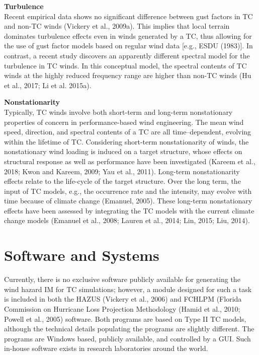 \noindent\textbf{Turbulence} \\Recent empirical data shows no significant difference between gust factors in TC and non-TC winds (Vickery et al., 2009a). This implies that local terrain dominates turbulence effects even in winds generated by a TC, thus allowing for the use of gust factor models based on regular wind data [e.g., ESDU (1983)]. In contrast, a recent study discovers an apparently different spectral model for the turbulence in TC winds. In this conceptual model, the spectral contents of TC winds at the highly reduced frequency range are higher than non-TC winds (Hu et al., 2017; Li et al. 2015a).
\newline

\noindent\textbf{Nonstationarity} \\Typically, TC winds involve both short-term and long-term nonstationary properties of concern in performance-based wind engineering. The mean wind speed, direction, and spectral contents of a TC are all time–dependent, evolving within the lifetime of TC. Considering short-term nonstationarity of winds, the nonstationary wind loading is induced on a target structure, whose effects on structural response as well as performance have been investigated (Kareem et al., 2018; Kwon and Kareem, 2009; Yau et al., 2011). Long-term nonstationarity effects relate to the life-cycle of the target structure. Over the long term, the input of TC models, e.g., the occurrence rate and the intensity, may evolve with time because of climate change (Emanuel, 2005). These long-term nonstationary effects have been assessed by integrating the TC models with the current climate change models (Emanuel et al., 2008; Lauren et al., 2014; Lin, 2015; Liu, 2014).

\section{Software and Systems}
\label{sec:storm_wind_tools}

Currently, there is no exclusive software publicly available for generating the wind hazard IM for TC simulations; however, a module designed for such a task is included in both the HAZUS (Vickery et al., 2006) and FCHLPM (Florida Commission on Hurricane Loss Projection Methodology (Hamid et al., 2010; Powell et al., 2005) software. Both programs are based on Type II TC models, although the technical details populating the programs are slightly different. The programs are Windows based, publicly available, and controlled by a GUI. Such in-house software exists in research laboratories around the world.

%
